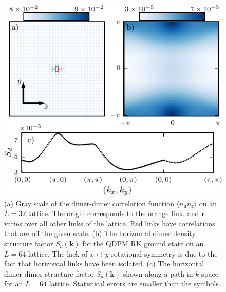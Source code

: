 \documentclass[twocolumn,prb,aps,floatfix,superscriptaddress]{revtex4-1}
\begin{document}
    \begin{figure}[t]
        \centering
        \includegraphics[width=1.0\columnwidth]{dimer_3way.pdf}
        \caption
        {
            (a) Gray scale of the dimer-dimer correlation function $\langle n_{\bm{0}}
            n_{\bm{r}}\rangle$ on an $L=32$ lattice. The origin corresponds to the orange link, and
            $\bm{r}$ varies over all other links of the lattice. Red links have correlations that are off
            the given scale. 
            (b) The horizontal dimer density structure factor $S_d(\bm{k})$ for the
            QDPM RK ground state on an $L=64$ lattice. The lack of $x\leftrightarrow y$ rotational
            symmetry is due to the fact that horizontal links have been isolated. 
            (c) The horizontal dimer-dimer structure factor $S_d(\bm{k})$ shown along a
            path in $k$ space for an $L=64$ lattice. Statistical errors are smaller than the symbols.
        }
        \label{fig:dimer_3way}
    \end{figure}
\end{document}
